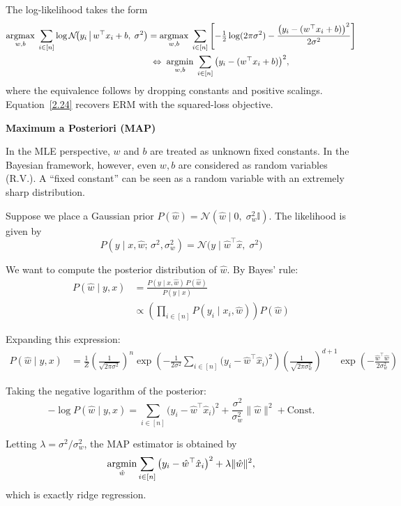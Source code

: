 \documentclass[../main]{subfiles}
\begin{document}
The log-likelihood takes the form
\begin{align}
  \mathop{\mathrm{argmax}}_{w,b}\; \sum_{i\in[n]}\log \mathcal N\!\big(y_i \,\big|\, w^\top x_i + b,\; \sigma^2\big)
  &= \mathop{\mathrm{argmax}}_{w,b}\; \sum_{i\in[n]}
     \left[
       -\tfrac{1}{2}\log(2\pi\sigma^2)
       - \frac{\big(y_i-(w^\top x_i+b)\big)^2}{2\sigma^2}
     \right]\notag\\
  &\;\Leftrightarrow\; \mathop{\mathrm{argmin}}_{w,b}\; \sum_{i\in[n]}\big(y_i-(w^\top x_i+b)\big)^2, \label{2.24}
\end{align}
where the equivalence follows by dropping constants and positive scalings. 
Equation~\eqref{2.24} recovers ERM with the squared-loss objective.
\begin{example}\textbf{Maximum a Posteriori (MAP)}
\end{example}
  In the MLE perspective, $w$ and $b$ are treated as unknown fixed constants. 
  In the Bayesian framework, however, even $w,b$ are considered as random variables (R.V.). 
  A “fixed constant” can be seen as a random variable with an extremely sharp distribution.
  
  Suppose we place a Gaussian prior $
    P(\hat w) = \mathcal N(\hat w \mid 0,\; \sigma_w^2 \mathbb I)$.
  The likelihood is given by
  \begin{equation}
      P(y \mid x, \hat w;\, \sigma^2, \sigma_w^2) = \mathcal N\!\big(y \mid \hat w^\top \hat x,\; \sigma^2\big)
  \end{equation}
  
  We want to compute the posterior distribution of $\hat w$. By Bayes' rule:
  \begin{align*}
    P(\hat w \mid y,x) 
    &= \frac{P(y \mid x, \hat w)\, P(\hat w)}{P(y \mid x)} \\
    &\propto \left( \prod_{i\in[n]} P(y_i \mid x_i, \hat w) \right) P(\hat w)
  \end{align*}
  
  Expanding this expression:
  \begin{align*}
    P(\hat w \mid y,x) 
    &= \frac{1}{Z}
       \left(\frac{1}{\sqrt{2\pi\sigma^2}}\right)^n
       \exp\!\left(-\frac{1}{2\sigma^2}\sum_{i\in[n]} \big(y_i-\hat w^\top \hat x_i\big)^2\right) 
       \left(\frac{1}{\sqrt{2\pi\sigma_w^2}}\right)^{d+1}
       \exp\!\left(-\frac{\hat w^\top \hat w}{2\sigma_w^2}\right)
  \end{align*}
  
  Taking the negative logarithm of the posterior:
  \[
    -\log P(\hat w \mid y,x) 
    = \sum_{i\in[n]} \big(y_i-\hat w^\top \hat x_i\big)^2 
      + \frac{\sigma^2}{\sigma_w^2} \|\hat w\|^2 + \text{Const}.
  \]
  
  Letting $\lambda = \sigma^2/\sigma_w^2$, the MAP estimator is obtained by
  \begin{equation}
      \mathop{\mathrm{argmin}}_{\hat w} \sum_{i\in[n]} \big(y_i-\hat w^\top \hat x_i\big)^2 + \lambda \|\hat w\|^2,
  \end{equation}
  which is exactly ridge regression.
\end{document}

